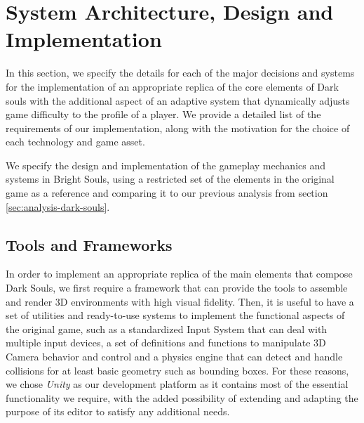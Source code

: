 \section{System Architecture, Design and Implementation}

In this section, we specify the details for each of the major decisions and systems for the implementation of an appropriate replica of the core elements of Dark souls with the additional aspect of an adaptive system that dynamically adjusts game difficulty to the profile of a player. We provide a detailed list of the requirements of our implementation, along with the motivation for the choice of each technology and game asset.

We specify the design and implementation of the gameplay mechanics and systems in Bright Souls, using a restricted set of the elements in the original game as a reference and comparing it to our previous analysis from section \ref{sec:analysis-dark-souls}.


\subsection{Tools and Frameworks}


In order to implement an appropriate replica of the main elements that compose Dark Souls, we first require a framework that can provide the tools to assemble and render 3D environments with high visual fidelity. Then, it is useful to have a set of utilities and ready-to-use systems to implement the functional aspects of the original game, such as a standardized Input System that can deal with multiple input devices, a set of definitions and functions to manipulate 3D Camera behavior and control and a physics engine that can detect and handle collisions for at least basic geometry such as bounding boxes. For these reasons, we chose \emph{Unity} as our development platform as it contains most of the essential functionality we require, with the added possibility of extending and adapting the purpose of its editor to satisfy any additional needs.

